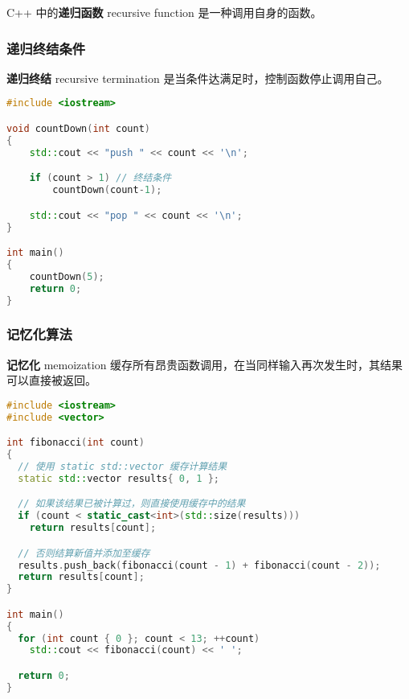 \documentclass[../../LearnCpp.tex]{subfiles}
\begin{document}

C++ 中的\textbf{递归函数} recursive function 是一种调用自身的函数。

\subsubsection*{递归终结条件}

\textbf{递归终结} recursive termination 是当条件达满足时，控制函数停止调用自己。

\begin{lstlisting}[language=C++]
#include <iostream>

void countDown(int count)
{
    std::cout << "push " << count << '\n';

    if (count > 1) // 终结条件
        countDown(count-1);

    std::cout << "pop " << count << '\n';
}

int main()
{
    countDown(5);
    return 0;
}
\end{lstlisting}

\subsubsection*{记忆化算法}

\textbf{记忆化} memoization 缓存所有昂贵函数调用，在当同样输入再次发生时，其结果可以直接被返回。

\begin{lstlisting}[language=C++]
#include <iostream>
#include <vector>

int fibonacci(int count)
{
  // 使用 static std::vector 缓存计算结果
  static std::vector results{ 0, 1 };

  // 如果该结果已被计算过，则直接使用缓存中的结果
  if (count < static_cast<int>(std::size(results)))
    return results[count];

  // 否则结算新值并添加至缓存
  results.push_back(fibonacci(count - 1) + fibonacci(count - 2));
  return results[count];
}

int main()
{
  for (int count { 0 }; count < 13; ++count)
    std::cout << fibonacci(count) << ' ';

  return 0;
}
\end{lstlisting}
\end{document}

